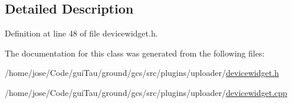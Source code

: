 \subsection{Detailed Description}


Definition at line 48 of file devicewidget.\-h.



The documentation for this class was generated from the following files\-:\begin{DoxyCompactItemize}
\item 
/home/jose/\-Code/gui\-Tau/ground/gcs/src/plugins/uploader/\hyperlink{devicewidget_8h}{devicewidget.\-h}\item 
/home/jose/\-Code/gui\-Tau/ground/gcs/src/plugins/uploader/\hyperlink{devicewidget_8cpp}{devicewidget.\-cpp}\end{DoxyCompactItemize}
